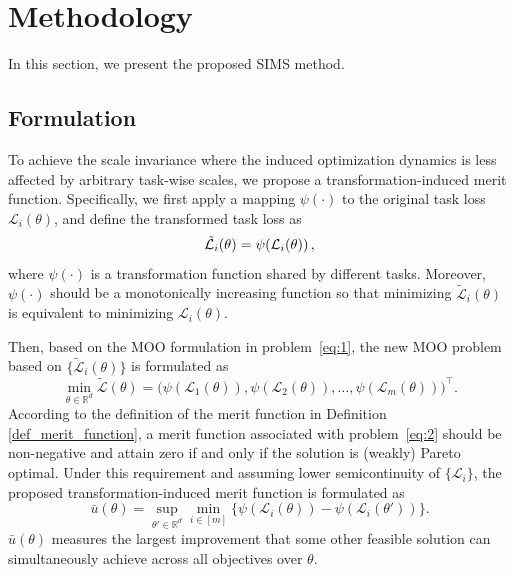 \documentclass[sigconf]{acmart}
\begin{document}
\section{Methodology}

In this section, we present the proposed SIMS method.

\subsection{Formulation}
\label{section:formulation}
To achieve the scale invariance where the induced optimization dynamics is less affected by arbitrary task-wise scales, we propose a transformation-induced merit function. %
Specifically, we first apply a mapping $\psi(\cdot)$ to the original task loss $\mathcal{L}_i(\theta)$, and %
define the transformed task loss as
\begin{align}
\tilde{\mathcal{L}}_i(\theta)=\psi\!\left(\mathcal{L}_i(\theta)\right)\notag,
\end{align}
where $\psi(\cdot)$ is a transformation function shared by different tasks. 
Moreover, $\psi(\cdot)$ should be a monotonically increasing function so that %
minimizing $\tilde{\mathcal{L}}_i(\theta)$ is equivalent to minimizing $\mathcal{L}_i(\theta)$.



Then, based on %
the MOO formulation in problem~\eqref{eq:1}, %
the new MOO problem based on $\{\tilde{\mathcal{L}}_i(\theta)\}$ is formulated as
\begin{equation}
\min_{\theta \in \mathbb{R}^d} \! \tilde{\boldsymbol{\mathcal{L}}}(\theta)\!
    =\!
    \bigl(
        \psi(\mathcal{L}_1(\theta)),\!
        \psi(\mathcal{L}_2(\theta)),\!
        \ldots,
        \psi(\mathcal{L}_m(\theta))
    \bigr)^\top\!.
    \label{eq:2}
\end{equation}
According to the definition of the merit function in Definition \ref{def_merit_function}, a merit function associated with problem~\eqref{eq:2} should be non-negative and attain zero if and only if the solution is (weakly) Pareto optimal. Under this requirement and assuming lower semicontinuity of $\{\mathcal{L}_i\}$, the proposed transformation-induced merit function is formulated as
\begin{equation}
    \bar{u}(\theta)=\sup_{\theta' \in \mathbb{R}^d}\min_{i \in [m]}
    \bigl\{\psi(\mathcal{L}_i(\theta))-\psi(\mathcal{L}_i(\theta'))\bigr\}.
    \label{eq:ubar}
\end{equation}
$\bar{u}(\theta)$ measures the largest improvement that some other feasible solution can simultaneously achieve across all objectives over $\theta$. 
\end{document}
